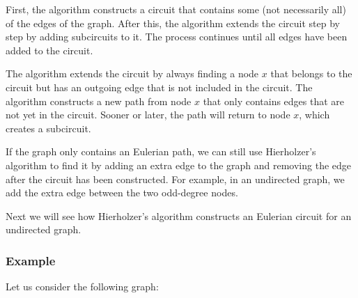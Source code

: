 First, the algorithm constructs a circuit that contains
some (not necessarily all) of the edges of the graph.
After this, the algorithm extends the circuit
step by step by adding subcircuits to it.
The process continues until all edges have been added
to the circuit.

The algorithm extends the circuit by always finding
a node $x$ that belongs to the circuit but has
an outgoing edge that is not included in the circuit.
The algorithm constructs a new path from node $x$
that only contains edges that are not yet in the circuit.
Sooner or later,
the path will return to node $x$,
which creates a subcircuit.

If the graph only contains an Eulerian path,
we can still use Hierholzer's algorithm
to find it by adding an extra edge to the graph
and removing the edge after the circuit
has been constructed.
For example, in an undirected graph,
we add the extra edge between the two
odd-degree nodes.

Next we will see how Hierholzer's algorithm
constructs an Eulerian circuit for an undirected graph.

\subsubsection{Example}

\begin{samepage}
Let us consider the following graph:
\begin{center}
\end{center}
\end{samepage}

